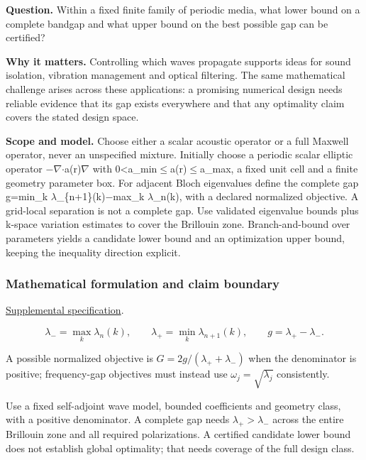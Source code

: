 \documentclass[
  11pt,
]{article}
\begin{document}
\textbf{Question.} Within a fixed finite family of periodic media, what
lower bound on a complete bandgap and what upper bound on the best
possible gap can be certified?

\textbf{Why it matters.} Controlling which waves propagate supports
ideas for sound isolation, vibration management and optical filtering.
The same mathematical challenge arises across these applications: a
promising numerical design needs reliable evidence that its gap exists
everywhere and that any optimality claim covers the stated design space.

\textbf{Scope and model.} Choose either a scalar acoustic operator or a
full Maxwell operator, never an unspecified mixture. Initially choose a
periodic scalar elliptic operator
\ensuremath{-}\ensuremath{\nabla}\ensuremath{\cdot}a(r)\ensuremath{\nabla}
with 0<a\_min\ensuremath{\le}a(r)\ensuremath{\le}a\_max, a fixed unit
cell and a finite geometry parameter box. For adjacent Bloch eigenvalues
define the complete gap g=min\_k
\ensuremath{\lambda}\_\{n+1\}(k)\ensuremath{-}max\_k
\ensuremath{\lambda}\_n(k), with a declared normalized objective. A
grid-local separation is not a complete gap. Use validated eigenvalue
bounds plus k-space variation estimates to cover the Brillouin zone.
Branch-and-bound over parameters yields a candidate lower bound and an
optimization upper bound, keeping the inequality direction explicit.

\subsubsection{Mathematical formulation and claim boundary}

\href{https://github.com/rick-stevens-ai/Pure-Thought/blob/main/supplemental/S02.md}{Supplemental
specification}.

\[\lambda_- =\max_k\lambda_n(k),\qquad
\lambda_+=\min_k\lambda_{n+1}(k),\qquad
g=\lambda_+-\lambda_-. \]

A possible normalized objective is \(G=2g/(\lambda_++\lambda_-)\) when
the denominator is positive; frequency-gap objectives must instead use
\(\omega_j=\sqrt{\lambda_j}\) consistently.

Use a fixed self-adjoint wave model, bounded coefficients and geometry
class, with a positive denominator. A complete gap needs
\(\lambda_+>\lambda_-\) across the entire Brillouin zone and all
required polarizations. A certified candidate lower bound does not
establish global optimality; that needs coverage of the full design
class.
\end{document}
